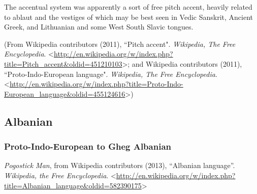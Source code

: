 \documentclass[11pt]{article}
\newcommand{\tab}{\hspace{25pt}}
\begin{document}
\tab The accentual system was apparently a sort of free pitch accent, heavily related to ablaut and the vestiges of which may be best seen in Vedic Sanskrit, Ancient Greek, and Lithuanian and some West South Slavic tongues.

\tab (From Wikipedia contributors (2011), \textquotedblleft Pitch accent". \textit{Wikipedia, The Free Encyclopedia}. \textless\url{http://en.wikipedia.org/w/index.php?title=Pitch_accent&oldid=451210103}\textgreater; and Wikipedia contributors (2011), \textquotedblleft Proto-Indo-European language". \textit{Wikipedia, The Free Encyclopedia}. \textless\url{http://en.wikipedia.org/w/index.php?title=Proto-Indo-European_language&oldid=455124616}\textgreater)

\subsection{Albanian}

\subsubsection{Proto-Indo-European to Gheg Albanian}{\it Pogostick Man}, from Wikipedia contributors (2013), ``Albanian language''. {\it Wikipedia, the Free Encyclopedia}. \textless\url{http://en.wikipedia.org/w/index.php?title=Albanian_language&oldid=582390175}\textgreater
\end{document}
